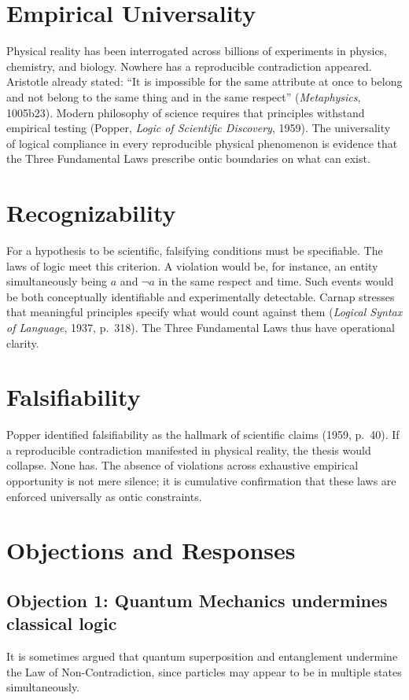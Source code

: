 \documentclass[12pt]{article}
\begin{document}
\section{Empirical Universality}
Physical reality has been interrogated across billions of experiments in physics, chemistry, and biology. Nowhere has a reproducible contradiction appeared. Aristotle already stated: ``It is impossible for the same attribute at once to belong and not belong to the same thing and in the same respect'' (\emph{Metaphysics}, 1005b23). Modern philosophy of science requires that principles withstand empirical testing (Popper, \emph{Logic of Scientific Discovery}, 1959). The universality of logical compliance in every reproducible physical phenomenon is evidence that the Three Fundamental Laws prescribe ontic boundaries on what can exist.

\section{Recognizability}
For a hypothesis to be scientific, falsifying conditions must be specifiable. The laws of logic meet this criterion. A violation would be, for instance, an entity simultaneously being $a$ and $\lnot a$ in the same respect and time. Such events would be both conceptually identifiable and experimentally detectable. Carnap stresses that meaningful principles specify what would count against them (\emph{Logical Syntax of Language}, 1937, p.~318). The Three Fundamental Laws thus have operational clarity.

\section{Falsifiability}
Popper identified falsifiability as the hallmark of scientific claims (1959, p.~40). If a reproducible contradiction manifested in physical reality, the thesis would collapse. None has. The absence of violations across exhaustive empirical opportunity is not mere silence; it is cumulative confirmation that these laws are enforced universally as ontic constraints.

\section{Objections and Responses}

\subsection*{Objection 1: Quantum Mechanics undermines classical logic}
It is sometimes argued that quantum superposition and entanglement undermine the Law of Non-Contradiction, since particles may appear to be in multiple states simultaneously.
\end{document}
